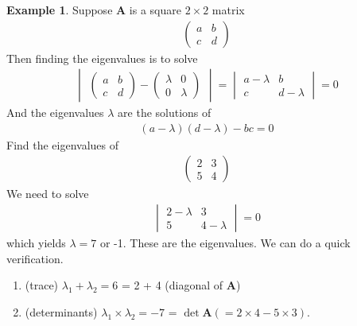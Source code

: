 \documentclass[10pt,a4paper]{book}
\theoremstyle{definition}\newtheorem{definition}{Definition}
\theoremstyle{definition}\newtheorem{fact}{Fact}
\theoremstyle{definition}\newtheorem{ex}{Ex.}
\theoremstyle{definition}\newtheorem{project}{Project}
\theoremstyle{definition}\newtheorem{problem}{Problem}
\theoremstyle{definition}\newtheorem{example}{Example}
\numberwithin{theorem}{chapter}
\numberwithin{corollary}{chapter}
\numberwithin{assumption}{chapter}
\numberwithin{definition}{chapter}
\numberwithin{prop}{chapter}
\numberwithin{notation}{chapter}
\numberwithin{problem}{chapter}
\numberwithin{example}{chapter}
\numberwithin{fact}{chapter}
\numberwithin{ex}{chapter}
\def\A{\mathbf A}
\begin{document}
		\begin{example}
		Suppose $\A$ is a square $2 \times 2$ matrix
		\begin{align*}
			\begin{pmatrix}
				a & b \\ c & d
			\end{pmatrix}
		\end{align*}
		Then finding the eigenvalues is to solve
		\begin{align*}
			\begin{vmatrix}
				\begin{pmatrix}
					a           & b \\ c & d
				\end{pmatrix} - 
				\begin{pmatrix}
					\lambda     & 0 \\ 0 & \lambda
				\end{pmatrix} 
			\end{vmatrix} = 
			\begin{vmatrix}
				a - \lambda & b \\ c & d-\lambda 
			\end{vmatrix} = 0
		\end{align*}
		And the eigenvalues $\lambda$ are the solutions of
		\begin{align*}
			(a-\lambda)(d-\lambda) - bc = 0 
		\end{align*}
		Find the eigenvalues of 
		\begin{align*}
			\begin{pmatrix}
				2 & 3 \\ 5 & 4
			\end{pmatrix}
		\end{align*}
		We need to solve
		\begin{align*}
			\begin{vmatrix}
				2 - \lambda & 3 \\ 5 & 4-\lambda
			\end{vmatrix} = 0
		\end{align*}
		which yields $\lambda = 7$ or -1. These are the eigenvalues. We can do a quick verification.
		\begin{enumerate}
			\item (trace) $\lambda_1 + \lambda_2 = 6$ = 2 + 4 (diagonal of $\A$)
			\item (determinants) $\lambda_1 \times \lambda_2 = -7$ = $\det \A (=2\times 4 - 5\times 3)$.
		\end{enumerate}
	\end{example}
	
\end{document}
